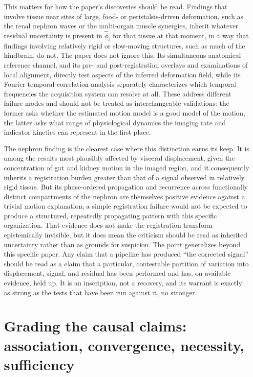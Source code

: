 \documentclass[11pt]{article}
\begin{document}
This matters for how the paper's discoveries should be read. Findings that involve tissue near sites of large, food- or peristalsis-driven deformation, such as the renal nephron waves or the multi-organ muscle synergies, inherit whatever residual uncertainty is present in $\widehat{\phi}_t$ for that tissue at that moment, in a way that findings involving relatively rigid or slow-moving structures, such as much of the hindbrain, do not. The paper does not ignore this. Its simultaneous anatomical reference channel, and its pre- and post-registration overlays and examinations of local alignment, directly test aspects of the inferred deformation field, while its Fourier temporal-correlation analysis separately characterizes which temporal frequencies the acquisition system can resolve at all. These address different failure modes and should not be treated as interchangeable validations: the former asks whether the estimated motion model is a good model of the motion, the latter asks what range of physiological dynamics the imaging rate and indicator kinetics can represent in the first place.

The nephron finding is the clearest case where this distinction earns its keep. It is among the results most plausibly affected by visceral displacement, given the concentration of gut and kidney motion in the imaged region, and it consequently inherits a registration burden greater than that of a signal observed in relatively rigid tissue. But its phase-ordered propagation and recurrence across functionally distinct compartments of the nephron are themselves positive evidence against a trivial motion explanation; a simple registration failure would not be expected to produce a structured, repeatedly propagating pattern with this specific organization. That evidence does not make the registration transform epistemically invisible, but it does mean the criticism should be read as inherited uncertainty rather than as grounds for suspicion. The point generalizes beyond this specific paper. Any claim that a pipeline has produced ``the corrected signal'' should be read as a claim that a particular, contestable partition of variation into displacement, signal, and residual has been performed and has, on available evidence, held up. It is an inscription, not a recovery, and its warrant is exactly as strong as the tests that have been run against it, no stronger.

\section{Grading the causal claims: association, convergence, necessity, sufficiency}
\end{document}
